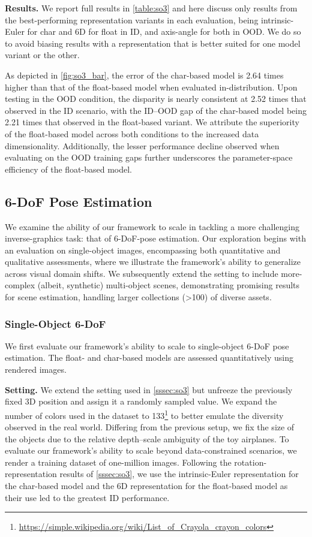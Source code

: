 \noindent\textbf{Results.}
We report full results in \cref{table:so3} and here discuss only results from the best-performing representation variants in each evaluation, being intrinsic-Euler for char and 6D for float in ID, and axis-angle for both in OOD.
We do so to avoid biasing results with a representation that is better suited for one model variant or the other.

As depicted in \cref{fig:so3_bar}, the error of the char-based model is 2.64 times higher than that of the float-based model when evaluated in-distribution.
Upon testing in the OOD condition, the disparity is nearly consistent at 2.52 times that observed in the ID scenario, with the ID--OOD gap of the char-based model being 2.21 times that observed in the float-based variant.
We attribute the superiority of the float-based model across both conditions to the increased data dimensionality.
Additionally, the lesser performance decline observed when evaluating on the OOD training gaps further underscores the parameter-space efficiency of the float-based model.

\subsection{6-DoF Pose Estimation}\label{ssec:6dof}

We examine the ability of our framework to scale in tackling a more challenging inverse-graphics task: that of 6-DoF-pose estimation.
Our exploration begins with an evaluation on single-object images, encompassing both quantitative and qualitative assessments, where we illustrate the framework's ability to generalize across visual domain shifts.
We subsequently extend the setting to include more-complex (albeit, synthetic) multi-object scenes, demonstrating promising results for scene estimation, handling larger collections (\textgreater 100) of diverse assets. 

\subsubsection{Single-Object 6-DoF}\label{sssec:single_6dof}
We first evaluate our framework's ability to scale to single-object 6-DoF pose estimation. The float- and char-based models are assessed quantitatively using rendered images. 

\noindent\textbf{Setting.}
We extend the setting used in \cref{sssec:so3} but unfreeze the previously fixed 3D position and assign it a randomly sampled value.
We expand the number of colors used in the dataset to 133\footnote{\url{https://simple.wikipedia.org/wiki/List_of_Crayola_crayon_colors}} to better emulate the diversity observed in the real world.
Differing from the previous setup, we fix the size of the objects due to the relative depth--scale ambiguity of the toy airplanes.
To evaluate our framework's ability to scale beyond data-constrained scenarios, we render a training dataset of one-million images.
Following the rotation-representation results of \cref{sssec:so3}, we use the intrinsic-Euler representation for the char-based model and the 6D representation for the float-based model as their use led to the greatest ID performance.


